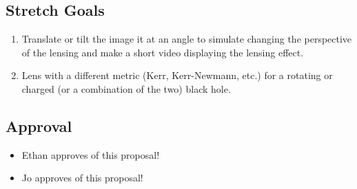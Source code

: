 \documentclass{article}
\begin{document}
\subsection*{Stretch Goals}
\begin{enumerate}
	\item Translate or tilt the image it at an angle to simulate changing the perspective of the lensing and make a short video displaying the lensing effect.
	\item Lens with a different metric (Kerr, Kerr-Newmann, etc.) for a rotating or charged (or a combination of the two) black hole. 
\end{enumerate}

\subsection*{Approval}
\begin{itemize}
	\item Ethan approves of this proposal!
	\item Jo approves of this proposal!
\end{itemize}
	
	
	
	
\end{document}
